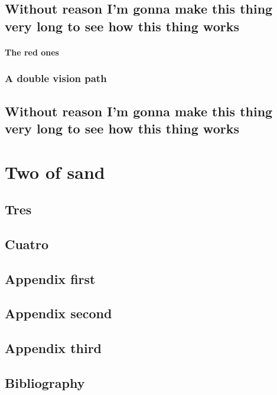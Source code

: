\documentclass[draft]{qx-files/qx-book}
\begin{document}
\lipsum[1]

\chapter*{Without reason I'm gonna make this thing very long to see how this thing works}

\subsection{The red ones}

\lipsum[1-2]

\section{A double vision path}

\lipsum

\chapter[Título largo]{Without reason I'm gonna make this thing very long to see how this thing works}
\lipsum


\part{Two of sand}

\chapter{Tres}
\lipsum


\chapter{Cuatro}
\lipsum[1]

\appendix

\chapter{Appendix first}


\lipsum[1]

\chapter{Appendix second}


\lipsum[1]

\chapter{Appendix third}


\lipsum[1]

\backmatter

\chapter{Bibliography}

\lipsum
\end{document}
